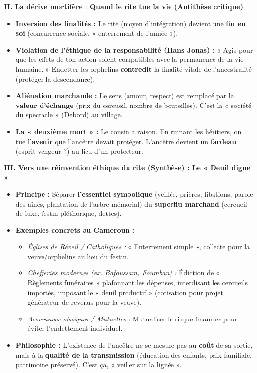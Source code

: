 \documentclass[11pt]{article}
\begin{document}
\begin{exoresolu}
\textbf{II. La dérive mortifère : Quand le rite tue la vie (Antithèse critique)}
\begin{itemize}
    \item \textbf{Inversion des finalités :} Le rite (moyen d'intégration) devient une \textbf{fin en soi} (concurrence sociale, « enterrement de l'année »).
    \item \textbf{Violation de l'éthique de la responsabilité (Hans Jonas) :} « Agis pour que les effets de ton action soient compatibles avec la permanence de la vie humaine. » Endetter les orphelins \textbf{contredit} la finalité vitale de l'ancestralité (protéger la descendance).
    \item \textbf{Aliénation marchande :} Le sens (amour, respect) est remplacé par la \textbf{valeur d'échange} (prix du cercueil, nombre de bouteilles). C'est la « société du spectacle » (Debord) au village.
    \item \textbf{La « deuxième mort » :} Le cousin a raison. En ruinant les héritiers, on tue l'\textbf{avenir} que l'ancêtre devait protéger. L'ancêtre devient un \textbf{fardeau} (esprit vengeur ?) au lieu d'un protecteur.
\end{itemize}

\textbf{III. Vers une réinvention éthique du rite (Synthèse) : Le « Deuil digne »}
\begin{itemize}
    \item \textbf{Principe :} Séparer \textbf{l'essentiel symbolique} (veillée, prières, libations, parole des aînés, plantation de l'arbre mémorial) du \textbf{superflu marchand} (cercueil de luxe, festin pléthorique, dettes).
    \item \textbf{Exemples concrets au Cameroun :}
    \begin{itemize}
        \item \emph{Églises de Réveil / Catholiques :} « Enterrement simple », collecte pour la veuve/orphelins au lieu du festin.
        \item \emph{Chefferies modernes (ex. Bafoussam, Foumban) :} Édiction de « Règlements funéraires » plafonnant les dépenses, interdisant les cercueils importés, imposant le « deuil productif » (cotisation pour projet générateur de revenus pour la veuve).
        \item \emph{Assurances obsèques / Mutuelles :} Mutualiser le risque financier pour éviter l'endettement individuel.
    \end{itemize}
    \item \textbf{Philosophie :} L'existence de l'ancêtre ne se mesure pas au \textbf{coût} de sa sortie, mais à la \textbf{qualité de la transmission} (éducation des enfants, paix familiale, patrimoine préservé). C'est ça, « veiller sur la lignée ».
\end{itemize}


\end{exoresolu}
\end{document}
